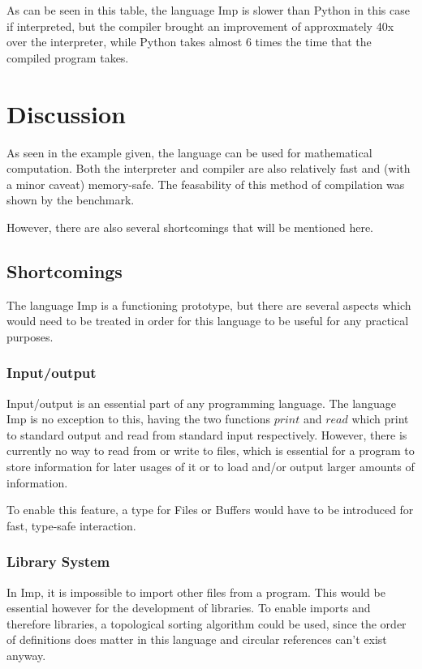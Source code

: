 \documentclass[12pt]{article}
\begin{document}
As can be seen in this table, the language Imp is slower than Python in this case if interpreted,
but the compiler brought an improvement of approxmately 40x over the interpreter, while Python
takes almost 6 times the time that the compiled program takes.

\section{Discussion}
As seen in the example given, the language
can be used for mathematical computation.
Both the interpreter and compiler are also relatively fast and
(with a minor caveat) memory-safe. The feasability of this method of
compilation was shown by the benchmark.

However, there are also several
shortcomings that will be mentioned here.

\subsection{Shortcomings}\label{shortcomings}
The language Imp is a functioning prototype, but there are several
aspects which would need to be treated in order for this language
to be useful for any practical purposes.

\subsubsection{Input/output}
Input/output is an essential part of any programming language.
The language Imp is no exception to this, having the two functions
$print$ and $read$ which print to standard output and read from
standard input respectively. However, there is currently no way
to read from or write to files, which is essential for a program
to store information for later usages of it or to load and/or output larger
amounts of information.

To enable this feature, a type for Files or Buffers would have to be
introduced for fast, type-safe interaction.

\subsubsection{Library System}
In Imp, it is impossible to import other files from a program.
This would be essential however for the development of libraries.
To enable imports and therefore libraries, a topological sorting
algorithm could be used, since the order of definitions does
matter in this language and circular references can't exist anyway.
\end{document}
